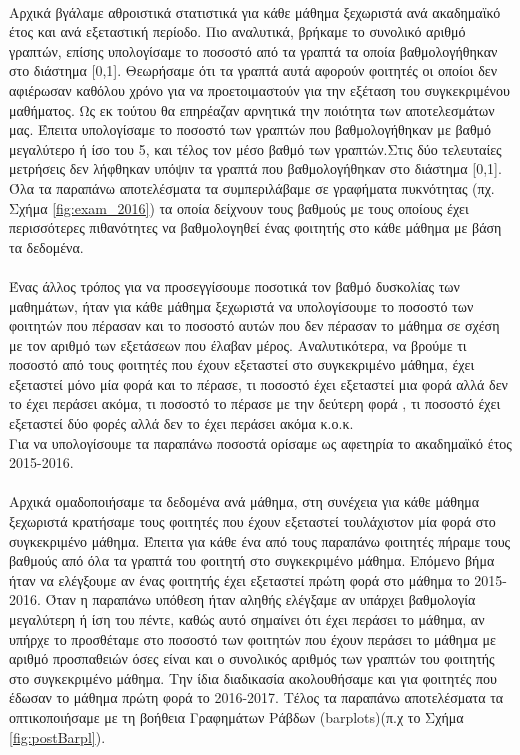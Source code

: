 \documentclass[12pt,a4paper,final]{article}
\begin{document}
\paragraph{}
Αρχικά βγάλαμε αθροιστικά στατιστικά για κάθε μάθημα ξεχωριστά ανά ακαδημαϊκό έτος και ανά εξεταστική περίοδο. Πιο αναλυτικά, βρήκαμε το συνολικό αριθμό γραπτών, επίσης υπολογίσαμε το ποσοστό από τα γραπτά τα οποία βαθμολογήθηκαν στο διάστημα [0,1]. Θεωρήσαμε ότι τα γραπτά αυτά αφορούν φοιτητές οι οποίοι δεν αφιέρωσαν καθόλου χρόνο για να προετοιμαστούν για την εξέταση του συγκεκριμένου μαθήματος. Ως εκ τούτου θα επηρέαζαν αρνητικά την ποιότητα των αποτελεσμάτων μας. Έπειτα υπολογίσαμε το ποσοστό των γραπτών που βαθμολογήθηκαν με  βαθμό μεγαλύτερο ή ίσο του 5, και τέλος τον μέσο βαθμό των γραπτών.Στις δύο τελευταίες μετρήσεις δεν λήφθηκαν υπόψιν τα γραπτά που βαθμολογήθηκαν στο διάστημα [0,1]. Όλα τα παραπάνω αποτελέσματα τα συμπεριλάβαμε σε γραφήματα πυκνότητας (πχ. Σχήμα \ref{fig:exam_2016}) τα οποία δείχνουν τους βαθμούς με τους οποίους έχει περισσότερες πιθανότητες να βαθμολογηθεί ένας φοιτητής στο κάθε μάθημα με βάση τα δεδομένα.
\paragraph{}
Ένας άλλος τρόπος για να προσεγγίσουμε ποσοτικά τον βαθμό δυσκολίας των μαθημάτων, ήταν για κάθε μάθημα ξεχωριστά να υπολογίσουμε το ποσοστό των φοιτητών που πέρασαν και το ποσοστό αυτών που δεν πέρασαν  το μάθημα σε σχέση με τον αριθμό των εξετάσεων που έλαβαν μέρος. Αναλυτικότερα, να βρούμε τι ποσοστό από τους φοιτητές που έχουν εξεταστεί στο συγκεκριμένο μάθημα, έχει εξεταστεί μόνο μία φορά και το πέρασε, τι ποσοστό έχει εξεταστεί μια φορά αλλά δεν το έχει περάσει ακόμα, τι ποσοστό το πέρασε με την δεύτερη φορά , τι ποσοστό έχει εξεταστεί δύο φορές αλλά δεν το έχει περάσει ακόμα κ.ο.κ. \\
Για να υπολογίσουμε τα παραπάνω ποσοστά ορίσαμε ως αφετηρία το ακαδημαϊκό έτος 2015-2016.
\paragraph{}
Αρχικά ομαδοποιήσαμε τα δεδομένα ανά μάθημα, στη συνέχεια για κάθε μάθημα ξεχωριστά κρατήσαμε τους φοιτητές που έχουν εξεταστεί  τουλάχιστον μία φορά στο συγκεκριμένο μάθημα. Έπειτα για κάθε ένα από τους παραπάνω φοιτητές πήραμε τους βαθμούς  από όλα τα γραπτά του φοιτητή στο συγκεκριμένο μάθημα. Επόμενο βήμα ήταν να ελέγξουμε αν ένας φοιτητής έχει εξεταστεί πρώτη φορά στο μάθημα το  2015-2016. Όταν η παραπάνω υπόθεση ήταν αληθής ελέγξαμε αν υπάρχει βαθμολογία μεγαλύτερη ή ίση του πέντε, καθώς αυτό σημαίνει ότι έχει περάσει το μάθημα, αν υπήρχε το προσθέταμε στο ποσοστό των φοιτητών που έχουν περάσει το μάθημα με αριθμό προσπαθειών όσες είναι και ο συνολικός αριθμός των γραπτών του φοιτητής στο συγκεκριμένο μάθημα. Την ίδια διαδικασία ακολουθήσαμε  και για φοιτητές που έδωσαν το μάθημα  πρώτη φορά το 2016-2017. Τέλος τα παραπάνω  αποτελέσματα τα οπτικοποιήσαμε  με τη βοήθεια Γραφημάτων Ράβδων (\foreignlanguage{english}{barplots})(π.χ το Σχήμα
 \ref{fig:postBarpl}).
\clearpage
\end{document}
